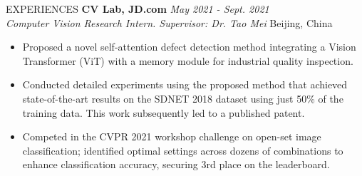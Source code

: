 \documentclass{resume} %
\begin{document}
\begin{rSection}{EXPERIENCES}
{\bf CV Lab, JD.com} \hfill {\em May 2021 - Sept. 2021} 
\\{\textit{Computer Vision Research Intern. Supervisor: Dr. Tao Mei} \hfill {Beijing, China}}
\begin{itemize}
    \vspace{-0.2cm}\item Proposed a novel self-attention defect detection method integrating a Vision Transformer (ViT) with a memory module for industrial quality inspection. 
    \vspace{-0.2cm}\item Conducted detailed experiments using the proposed method that achieved state-of-the-art results on the SDNET 2018 dataset using just 50\% of the training data. This work subsequently led to a published patent. 
    \vspace{-0.2cm}\item Competed in the CVPR 2021 workshop challenge on open-set image classification; identified optimal settings across dozens of combinations to enhance classification accuracy, securing 3rd place on the leaderboard.
\end{itemize}

\end{rSection}
\end{document}
